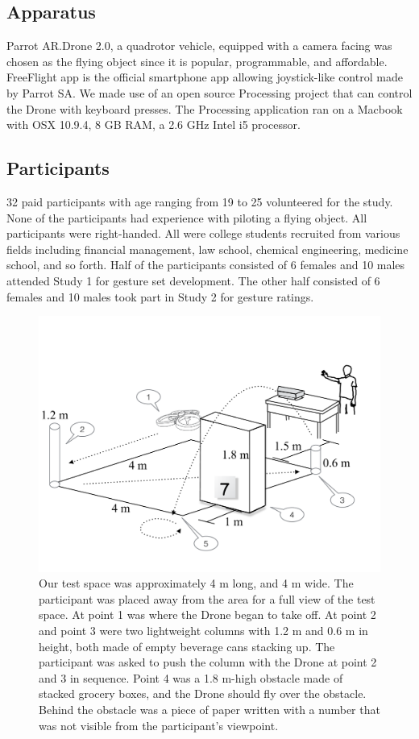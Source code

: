 \documentclass{sigchi}
\begin{document}
\subsection{Apparatus}

Parrot AR.Drone 2.0, a quadrotor vehicle, equipped with a camera facing was chosen as the flying object since it is popular, programmable, and affordable. FreeFlight app is the official smartphone app allowing joystick-like control made by Parrot SA. We made use of an open source Processing project that can control the Drone with keyboard presses. The Processing application ran on a Macbook with OSX 10.9.4, 8 GB RAM, a 2.6 GHz Intel i5 processor.

\subsection{Participants}

32 paid participants with age ranging from 19 to 25 volunteered for the study. None of the participants had experience with piloting a flying object. All participants were right-handed. All were college students recruited from various fields including financial management, law school, chemical engineering, medicine school, and so forth. Half of the participants consisted of 6 females and 10 males attended Study 1 for gesture set development. The other half consisted of 6 females and 10 males took part in Study 2 for gesture ratings.

\begin{figure}[!h]
\centering
\includegraphics[width=1\columnwidth]{TaskFigure.pdf}
\caption{Our test space was approximately 4 m long, and 4 m wide. The participant was placed away from the area for a full view of the test space. At point 1 was where the Drone began to take off. At point 2 and point 3 were two lightweight columns with 1.2 m and 0.6 m in height, both made of empty beverage cans stacking up. The participant was asked to push the column with the Drone at point 2 and 3 in sequence. Point 4 was a 1.8 m-high obstacle made of stacked grocery boxes, and the Drone should fly over the obstacle. Behind the obstacle was a piece of paper written with a number that was not visible from the participant's viewpoint.}
\label{fig:figure1}
\end{figure}
\end{document}
